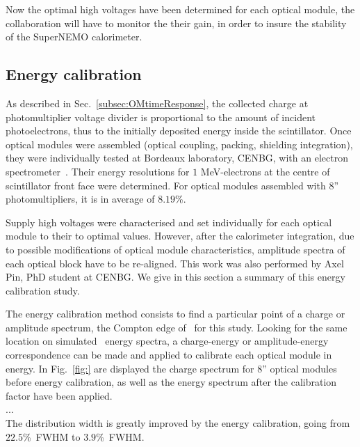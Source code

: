 Now the optimal high voltages have been determined for each optical module, the collaboration will have to monitor the their gain, in order to insure the stability of the SuperNEMO calorimeter.



\subsection{Energy calibration}
\label{sec:comm_energy_calibration}

As described in Sec.~\ref{subsec:OMtimeResponse}, the collected charge at photomultiplier voltage divider is proportional to the amount of incident photoelectrons, thus to the initially deposited energy inside the scintillator.
Once optical modules were assembled (optical coupling, packing, shielding integration), they were individually tested at Bordeaux laboratory, CENBG, with an electron spectrometer~\cite{HuberThesis}.
Their energy resolutions for $1$ MeV-electrons at the centre of scintillator front face were determined.
For optical modules assembled with $8$'' photomultipliers, it is in average of $8.19$\%.

Supply high voltages were characterised and set individually for each optical module to their to optimal values.
However, after the calorimeter integration, due to possible modifications of optical module characteristics, amplitude spectra of each optical block have to be re-aligned.
This work was also performed by Axel Pin, PhD student at CENBG.
We give in this section a summary of this energy calibration study.

The energy calibration method consists to find a particular point of a charge or amplitude spectrum, the Compton edge of \Tl\ for this study.
Looking for the same location on simulated \Tl\ energy spectra, a charge-energy or amplitude-energy correspondence can be made and applied to calibrate each optical module in energy.
In Fig.~\ref{fig:} are displayed the charge spectrum for $8$'' optical modules before energy calibration, as well as the energy spectrum after the calibration factor have been applied.
\\...\\
The distribution width is greatly improved by the energy calibration, going from $22.5$\%~FWHM to $3.9$\%~FWHM.

